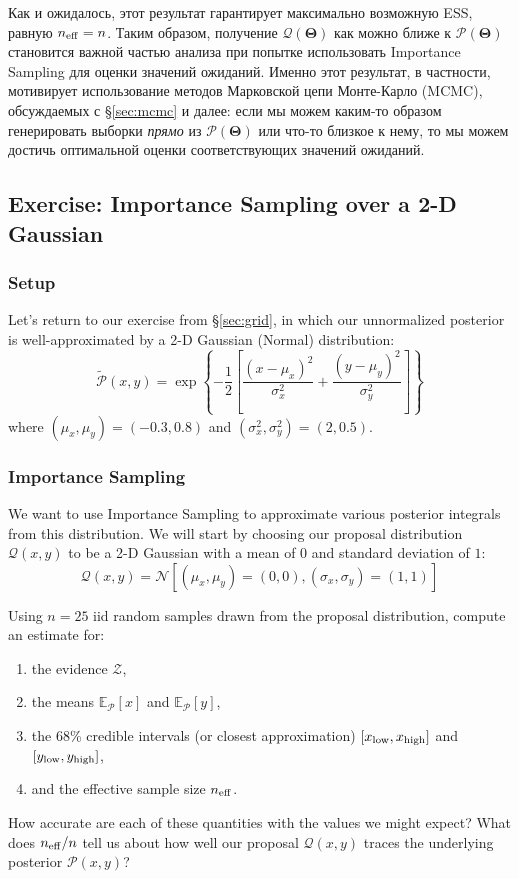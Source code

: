 \documentclass[12pt, titlepage]{article}
\newcommand{\Normal}[2]{\ensuremath{\mathcal{N}\left[{#1}, {#2} \right]}} %
\newcommand{\meanwrt}[2]{\ensuremath{\mathbb{E}_{{#2}}\left[{#1}\right]}}
\newcommand{\params}{\ensuremath{\boldsymbol\Theta}}
\newcommand{\posterior}{\ensuremath{\mathcal{P}}}
\newcommand{\proposal}{\ensuremath{\mathcal{Q}}}
\newcommand{\evidence}{\ensuremath{\mathcal{Z}}}
\begin{document}
Как и ожидалось, этот результат гарантирует максимально возможную ESS, равную $n_{\rm eff} = n$. Таким образом, получение $\proposal(\params)$ как можно ближе к $\posterior(\params)$ становится важной частью анализа при попытке использовать Importance Sampling для оценки значений ожиданий. Именно этот результат, в частности, мотивирует использование методов Марковской цепи Монте-Карло (MCMC), обсуждаемых с \S\ref{sec:mcmc} и далее: если мы можем каким-то образом генерировать выборки \textit{прямо} из $\posterior(\params)$ или что-то близкое к нему, то мы можем достичь оптимальной оценки соответствующих значений ожиданий.

\subsection*{Exercise: Importance Sampling over a 2-D Gaussian} 
\label{exercise:importance}

\subsubsection*{Setup}

Let's return to our exercise from \S\ref{sec:grid}, in which
our unnormalized posterior is well-approximated by a 2-D Gaussian (Normal)
distribution:
\begin{equation*}
    \tilde{\posterior}(x,y) 
    = \exp\left\{-\frac{1}{2}\left[\frac{(x-\mu_x)^2}{\sigma_x^2}
    + \frac{(y-\mu_y)^2}{\sigma_y^2}\right]\right\}
\end{equation*}
where $(\mu_x,\mu_y)=(-0.3,0.8)$ and $(\sigma_x^2,\sigma_y^2)=(2,0.5)$.

\subsubsection*{Importance Sampling}

We want to use Importance Sampling to approximate various posterior
integrals from this distribution.
We will start by choosing our proposal distribution $\proposal(x,y)$
to be a 2-D Gaussian with a mean of $0$ and standard deviation of $1$:
\begin{equation*}
    \proposal(x,y) = \Normal{(\mu_x,\mu_y)=(0,0)}{(\sigma_x,\sigma_y)=(1,1)}
\end{equation*}

Using $n=25$ iid random samples drawn 
from the proposal distribution, compute an estimate for:
\begin{enumerate}
    \item the evidence $\evidence$,
    \item the means $\meanwrt{x}{\posterior}$
    and $\meanwrt{y}{\posterior}$,
    \item the 68\% credible intervals (or closest approximation) 
    $[x_{\rm low}, x_{\rm high}]$ and $[y_{\rm low}, y_{\rm high}]$,
    \item and the effective sample size $n_{\rm eff}$.
\end{enumerate}
How accurate are each of these quantities with the values we might
expect? What does $n_{\rm eff}/n$ tell us about how well
our proposal $\proposal(x,y)$ traces the underlying posterior
$\posterior(x,y)$?
\end{document}
